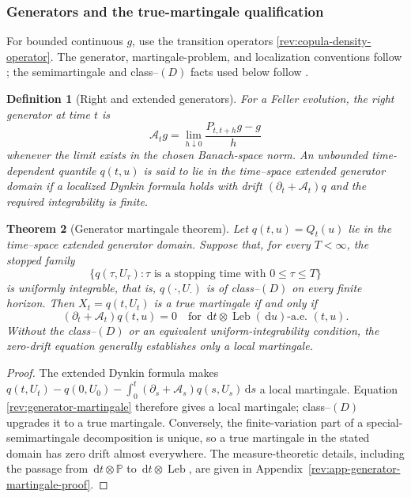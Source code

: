 \documentclass[11pt]{article}
\newtheorem{definition}{Definition}[section]
\newtheorem{theorem}[definition]{Theorem}
\theoremstyle{remark}
\newcommand{\Pp}{\mathbb P}
\newcommand{\dd}{\,\mathrm d}
\newcommand{\Leb}{\operatorname{Leb}}
\begin{document}
\subsubsection{Generators and the true-martingale qualification}

For bounded continuous $g$, use the transition operators
\eqref{rev:copula-density-operator}.  The generator, martingale-problem, and
localization conventions follow \citet[Chapter~4]{EthierKurtz1986}; the
semimartingale and class--$(D)$ facts used below follow
\citet[Chapters~I--III]{Protter2005}.

\begin{definition}[Right and extended generators]
\label{rev:def-generator}
For a Feller evolution, the right generator at time $t$ is
\begin{equation}
\mathcal A_tg=\lim_{h\downarrow0}
\frac{P_{t,t+h}g-g}{h}
\label{rev:right-generator}
\end{equation}
whenever the limit exists in the chosen Banach-space norm.  An unbounded
time-dependent quantile $q(t,u)$ is said to lie in the time--space
\emph{extended generator domain} if a localized Dynkin formula holds with
drift $(\partial_t+\mathcal A_t)q$ and the required integrability is finite.
\end{definition}

\begin{theorem}[Generator martingale theorem]
\label{rev:thm-generator-martingale}
Let $q(t,u)=Q_t(u)$ lie in the time--space extended generator domain.  Suppose
that, for every $T<\infty$, the stopped family
\[
\{q(\tau,U_\tau):\tau\text{ is a stopping time with }0\le\tau\le T\}
\]
is uniformly integrable, that is, $q(\cdot,U_\cdot)$ is of class--$(D)$ on
every finite horizon.  Then
$X_t=q(t,U_t)$ is a true martingale if and only if
\begin{equation}
(\partial_t+\mathcal A_t)q(t,u)=0
\quad\text{for }\dd t\otimes\Leb(\dd u)\text{-a.e. }(t,u).
\label{rev:generator-martingale}
\end{equation}
Without the class--$(D)$ or an equivalent uniform-integrability condition, the
zero-drift equation generally establishes only a local martingale.
\end{theorem}

\begin{proof}
The extended Dynkin formula makes
$q(t,U_t)-q(0,U_0)-\int_0^t(\partial_s+\mathcal A_s)q(s,U_s)\dd s$
a local martingale.  Equation \eqref{rev:generator-martingale} therefore gives
a local martingale; class--$(D)$ upgrades it to a true martingale.  Conversely,
the finite-variation part of a special-semimartingale decomposition is unique,
so a true martingale in the stated domain has zero drift almost everywhere.
The measure-theoretic details, including the passage from
$\dd t\otimes\Pp$ to $\dd t\otimes\Leb$, are given in
Appendix~\ref{rev:app-generator-martingale-proof}.
\end{proof}
\end{document}
